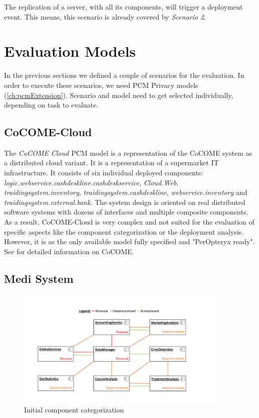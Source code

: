 The replication of a server, with all its components, will trigger a deployment event. This means, this scenario is already covered by \textit{Scenario 2}.


\section{Evaluation Models}
\label{sec:Evaluation:models}

In the previous sections we defined a couple of scenarios for the evaluation. In order to execute these scenarios, we need PCM Privacy models (\autoref{ch:pcmExtension}). Scenario and model need to get selected individually, depending on task to evaluate.

\subsection{CoCOME-Cloud}
\label{sec:eval:models:cocome}

The \textit{CoCOME Cloud} PCM model is a representation of the CoCOME system as a distributed cloud variant. It is a representation of a supermarket IT infrastructure. It consists of six individual deployed components:  \textit{logic.webservice.cashdeskline.cashdeskservice}, \textit{Cloud.Web}, \textit{traidingsystem.inventory}, \textit{traidingsystem.cashdeskline}, \textit{webservice.inventory} and \textit{traidingsystem.external.bank}. The system design is oriented on real distributed software systems with dozens of interfaces and multiple composite components. As a result, CoCOME-Cloud is very complex and not suited for the evaluation of specific aspects like the component categorization or the deployment analysis. However, it is as the only available model fully specified and "PerOpteryx ready". See \cite{Heinrich.2015} for detailed information on CoCOME.


\subsection{Medi System}
\label{sec:eval:models:medSys}

\begin{figure}[h]
	\centering
	\includegraphics[trim = 0mm 10mm 0mm 20mm, clip, width=0.90\textwidth]{graphs/medSystem_noserver}
	\caption{Initial component categorization}
	\label{fig:model:medi}
\end{figure}

